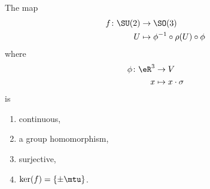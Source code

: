 \begin{proposition}     \label{PROPooGEHAooPCReoU}
    The map
    \begin{equation}        \label{EQooSOZTooTIkONx}
        \begin{aligned}
            f\colon \SU(2)&\to \SO(3) \\
            U&\mapsto \phi^{-1}\circ \rho(U)\circ\phi 
        \end{aligned}
    \end{equation}
    where
    \begin{equation}
        \begin{aligned}
            \phi\colon \eR^3&\to V \\
            x&\mapsto x\cdot \sigma 
        \end{aligned}
    \end{equation}
    is
    \begin{enumerate}
        \item
            continuous,
        \item
            a group homomorphism,
        \item
            surjective,
        \item
            \( \ker(f)=\{ \pm \mtu \}\).
    \end{enumerate}
\end{proposition}

